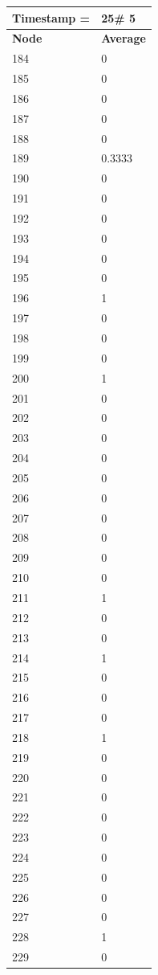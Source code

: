 \begin{tabular}{|l||l|}
\hline
\textbf{Timestamp =} & \textbf{25}\# 5\\\hline
	\textbf{Node} & \textbf{Average} \\ \hline
\hline
	184 & 0 \\ \hline
	185 & 0 \\ \hline
	186 & 0 \\ \hline
	187 & 0 \\ \hline
	188 & 0 \\ \hline
	189 & 0.3333 \\ \hline
	190 & 0 \\ \hline
	191 & 0 \\ \hline
	192 & 0 \\ \hline
	193 & 0 \\ \hline
	194 & 0 \\ \hline
	195 & 0 \\ \hline
	196 & 1 \\ \hline
	197 & 0 \\ \hline
	198 & 0 \\ \hline
	199 & 0 \\ \hline
	200 & 1 \\ \hline
	201 & 0 \\ \hline
	202 & 0 \\ \hline
	203 & 0 \\ \hline
	204 & 0 \\ \hline
	205 & 0 \\ \hline
	206 & 0 \\ \hline
	207 & 0 \\ \hline
	208 & 0 \\ \hline
	209 & 0 \\ \hline
	210 & 0 \\ \hline
	211 & 1 \\ \hline
	212 & 0 \\ \hline
	213 & 0 \\ \hline
	214 & 1 \\ \hline
	215 & 0 \\ \hline
	216 & 0 \\ \hline
	217 & 0 \\ \hline
	218 & 1 \\ \hline
	219 & 0 \\ \hline
	220 & 0 \\ \hline
	221 & 0 \\ \hline
	222 & 0 \\ \hline
	223 & 0 \\ \hline
	224 & 0 \\ \hline
	225 & 0 \\ \hline
	226 & 0 \\ \hline
	227 & 0 \\ \hline
	228 & 1 \\ \hline
	229 & 0 \\ \hline
\end{tabular}
